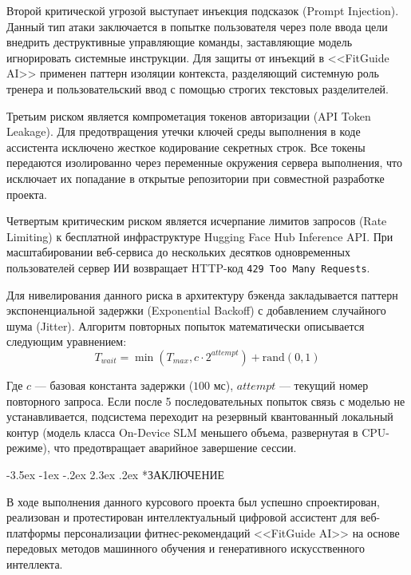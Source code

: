 \documentclass[14pt, a4paper]{extarticle}
\makeatletter
\renewcommand\section{\@startsection {section}{1}{\z@}%
                                   {-3.5ex \@plus -1ex \@minus -.2ex}%
                                   {2.3ex \@plus.2ex}%
                                   {\centering\normalfont\Large\bfseries}}
\makeatother
\begin{document}
Второй критической угрозой выступает инъекция подсказок (Prompt Injection). Данный тип атаки заключается в попытке пользователя через поле ввода цели внедрить деструктивные управляющие команды, заставляющие модель игнорировать системные инструкции. Для защиты от инъекций в <<FitGuide AI>> применен паттерн изоляции контекста, разделяющий системную роль тренера и пользовательский ввод с помощью строгих текстовых разделителей.

Третьим риском является компрометация токенов авторизации (API Token Leakage). Для предотвращения утечки ключей среды выполнения в коде ассистента исключено жесткое кодирование секретных строк. Все токены передаются изолированно через переменные окружения сервера выполнения, что исключает их попадание в открытые репозитории при совместной разработке проекта.

Четвертым критическим риском является исчерпание лимитов запросов (Rate Limiting) к бесплатной инфраструктуре Hugging Face Hub Inference API. При масштабировании веб-сервиса до нескольких десятков одновременных пользователей сервер ИИ возвращает HTTP-код \texttt{429 Too Many Requests}.

Для нивелирования данного риска в архитектуру бэкенда закладывается паттерн экспоненциальной задержки (Exponential Backoff) с добавлением случайного шума (Jitter). Алгоритм повторных попыток математически описывается следующим уравнением:
\begin{equation}
T_{wait} = \min\left(T_{max}, c \cdot 2^{attempt}\right) + \text{rand}(0, 1)
\end{equation}

Где $c$ --- базовая константа задержки ($100$ мс), $attempt$ --- текущий номер повторного запроса. Если после 5 последовательных попыток связь с моделью не устанавливается, подсистема переходит на резервный квантованный локальный контур (модель класса On-Device SLM меньшего объема, развернутая в CPU-режиме), что предотвращает аварийное завершение сессии.


\newpage
{}
\section*{ЗАКЛЮЧЕНИЕ}

В ходе выполнения данного курсового проекта был успешно спроектирован, реализован и протестирован интеллектуальный цифровой ассистент для веб-платформы персонализации фитнес-рекомендаций <<FitGuide AI>> на основе передовых методов машинного обучения и генеративного искусственного интеллекта.
\end{document}
